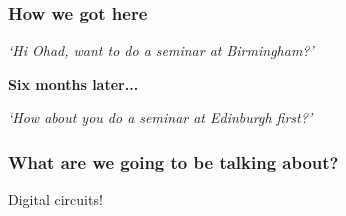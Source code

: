 \begin{frame}
    \frametitle{How we got here}
    \centering
    \wait
    \qquad
    \begin{minipage}{0.7\textwidth}
        \emph{`Hi Ohad, want to do a seminar at Birmingham?'}
    \end{minipage}

    \wait
    \LARGE
    \textbf{Six months later...}
    \normalsize
    \wait

    \begin{minipage}{0.6\textwidth}
        \emph{`How about you do a seminar at Edinburgh first?'}
    \end{minipage}
    \qquad
\end{frame}

\begin{frame}
    \frametitle{What are we going to be talking about?}

    \wait
    \centering
    \LARGE
    Digital circuits!

    \begin{center}
    \end{center}

\end{frame}

